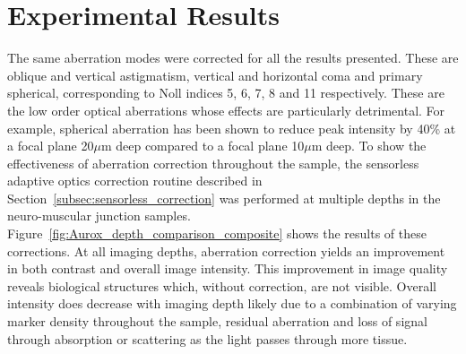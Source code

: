 \section{Experimental Results}
\label{sec:Aurox_results}

The same aberration modes were corrected for all the results presented. 
These are oblique and vertical astigmatism, vertical and horizontal coma 
and primary spherical, corresponding to Noll indices 5, 6, 7, 8 and 11 
respectively\cite{noll1976zernike}. These are the low order optical 
aberrations whose effects are particularly detrimental. For example, 
spherical aberration has been shown to reduce peak intensity by 40\% at
a focal plane 20$\mu$m deep compared to a focal plane 10$\mu$m 
deep\cite{hell1993aberrations}. To show the effectiveness of aberration 
correction throughout the sample, the sensorless adaptive optics correction
routine described in Section~\ref{subsec:sensorless_correction} was performed
at multiple depths in the neuro-muscular junction samples. Figure~\ref{fig:Aurox_depth_comparison_composite} shows the results of 
these corrections. At all imaging depths, aberration correction yields an 
improvement in both contrast and overall image intensity. This improvement 
in image quality reveals biological structures which, without correction, 
are not visible. Overall intensity does decrease with imaging depth likely 
due to a combination of varying marker density throughout the sample, 
residual aberration and loss of signal through absorption or scattering 
as the light passes through more tissue.

